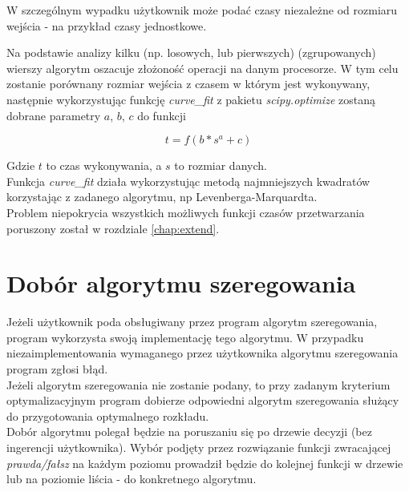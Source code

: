 \documentclass[brudnopis]{xmgr}
\begin{document}
W szczególnym wypadku użytkownik może podać czasy niezależne od rozmiaru wejścia - na przykład czasy jednostkowe.
\medskip\\


Na podstawie analizy kilku (np. losowych, lub pierwszych) (zgrupowanych) wierszy algorytm oszacuje złożoność operacji na danym procesorze.
W tym celu zostanie porównany rozmiar wejścia z czasem w którym jest wykonywany, następnie wykorzystując funkcję \emph{curve\_fit} z pakietu \emph{scipy.optimize} zostaną dobrane parametry $a$, $b$, $c$ do funkcji

$$t = f(b * s^a + c)$$

Gdzie $t$ to czas wykonywania, a $s$ to rozmiar danych.
\medskip\\

Funkcja \emph{curve\_fit} działa wykorzystując metodą najmniejszych kwadratów korzystając z zadanego algorytmu, np Levenberga-Marquardta.
\medskip\\

Problem niepokrycia wszystkich możliwych funkcji czasów przetwarzania poruszony został w rozdziale \ref{chap:extend}.


\section{Dobór algorytmu szeregowania}


Jeżeli użytkownik poda obsługiwany przez program algorytm szeregowania, program wykorzysta swoją implementację tego algorytmu.
W przypadku niezaimplementowania wymaganego przez użytkownika algorytmu szeregowania program zgłosi błąd.
\medskip\\

Jeżeli algorytm szeregowania nie zostanie podany, to przy zadanym kryterium optymalizacyjnym program dobierze odpowiedni algorytm szeregowania służący do przygotowania optymalnego rozkładu.
\medskip\\

Dobór algorytmu polegał będzie na poruszaniu się po drzewie decyzji (bez ingerencji użytkownika).
Wybór podjęty przez rozwiązanie funkcji zwracającej \emph{prawda/fałsz} na każdym poziomu prowadził będzie do kolejnej funkcji w drzewie lub na poziomie liścia - do konkretnego algorytmu.
\end{document}
